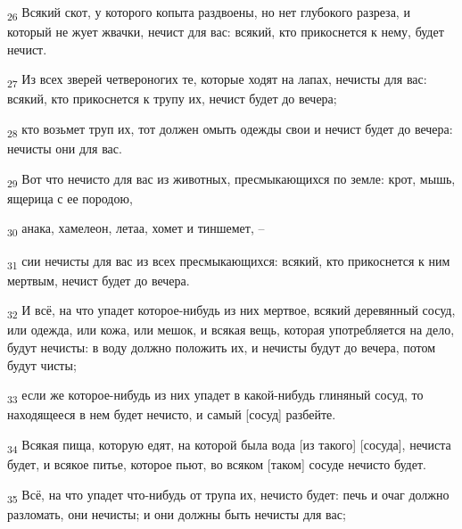 \begin{tcolorbox}
\textsubscript{26} Всякий скот, у которого копыта раздвоены, но нет глубокого разреза, и который не жует жвачки, нечист для вас: всякий, кто прикоснется к нему, будет нечист.
\end{tcolorbox}
\begin{tcolorbox}
\textsubscript{27} Из всех зверей четвероногих те, которые ходят на лапах, нечисты для вас: всякий, кто прикоснется к трупу их, нечист будет до вечера;
\end{tcolorbox}
\begin{tcolorbox}
\textsubscript{28} кто возьмет труп их, тот должен омыть одежды свои и нечист будет до вечера: нечисты они для вас.
\end{tcolorbox}
\begin{tcolorbox}
\textsubscript{29} Вот что нечисто для вас из животных, пресмыкающихся по земле: крот, мышь, ящерица с ее породою,
\end{tcolorbox}
\begin{tcolorbox}
\textsubscript{30} анака, хамелеон, летаа, хомет и тиншемет, --
\end{tcolorbox}
\begin{tcolorbox}
\textsubscript{31} сии нечисты для вас из всех пресмыкающихся: всякий, кто прикоснется к ним мертвым, нечист будет до вечера.
\end{tcolorbox}
\begin{tcolorbox}
\textsubscript{32} И всё, на что упадет которое-нибудь из них мертвое, всякий деревянный сосуд, или одежда, или кожа, или мешок, и всякая вещь, которая употребляется на дело, будут нечисты: в воду должно положить их, и нечисты будут до вечера, потом будут чисты;
\end{tcolorbox}
\begin{tcolorbox}
\textsubscript{33} если же которое-нибудь из них упадет в какой-нибудь глиняный сосуд, то находящееся в нем будет нечисто, и самый [сосуд] разбейте.
\end{tcolorbox}
\begin{tcolorbox}
\textsubscript{34} Всякая пища, которую едят, на которой была вода [из такого] [сосуда], нечиста будет, и всякое питье, которое пьют, во всяком [таком] сосуде нечисто будет.
\end{tcolorbox}
\begin{tcolorbox}
\textsubscript{35} Всё, на что упадет что-нибудь от трупа их, нечисто будет: печь и очаг должно разломать, они нечисты; и они должны быть нечисты для вас;
\end{tcolorbox}
